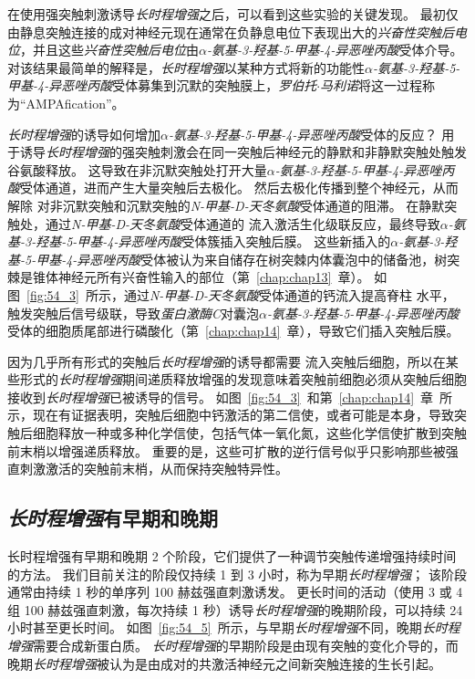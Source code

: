 在使用强突触刺激诱导\textit{长时程增强}之后，可以看到这些实验的关键发现。
最初仅由静息突触连接的成对神经元现在通常在负静息电位下表现出大的\textit{兴奋性突触后电位}，并且这些\textit{兴奋性突触后电位}由\textit{$\alpha$-氨基-3-羟基-5-甲基-4-异恶唑丙酸}受体介导。
对该结果最简单的解释是，\textit{长时程增强}以某种方式将新的功能性\textit{$\alpha$-氨基-3-羟基-5-甲基-4-异恶唑丙酸}受体募集到沉默的突触膜上，\textit{罗伯托$\cdot$马利诺}将这一过程称为“AMPAfication”。


\textit{长时程增强}的诱导如何增加\textit{$\alpha$-氨基-3-羟基-5-甲基-4-异恶唑丙酸}受体的反应？
用于诱导\textit{长时程增强}的强突触刺激会在同一突触后神经元的静默和非静默突触处触发谷氨酸释放。
这导致在非沉默突触处打开大量\textit{$\alpha$-氨基-3-羟基-5-甲基-4-异恶唑丙酸}受体通道，进而产生大量突触后去极化。
然后去极化传播到整个神经元，从而解除  对非沉默突触和沉默突触的\textit{N-甲基-D-天冬氨酸}受体通道的阻滞。
在静默突触处，通过\textit{N-甲基-D-天冬氨酸}受体通道的  流入激活生化级联反应，最终导致\textit{$\alpha$-氨基-3-羟基-5-甲基-4-异恶唑丙酸}受体簇插入突触后膜。
这些新插入的\textit{$\alpha$-氨基-3-羟基-5-甲基-4-异恶唑丙酸}受体被认为来自储存在树突棘内体囊泡中的储备池，树突棘是锥体神经元所有兴奋性输入的部位（第~\ref{chap:chap13}~章）。
如图~\ref{fig:54_3}~所示，通过\textit{N-甲基-D-天冬氨酸}受体通道的钙流入提高脊柱  水平，触发突触后信号级联，导致\textit{蛋白激酶C}对囊泡\textit{$\alpha$-氨基-3-羟基-5-甲基-4-异恶唑丙酸}受体的细胞质尾部进行磷酸化（第~\ref{chap:chap14}~章），导致它们插入突触后膜。


因为几乎所有形式的突触后\textit{长时程增强}的诱导都需要  流入突触后细胞，所以在某些形式的\textit{长时程增强}期间递质释放增强的发现意味着突触前细胞必须从突触后细胞接收到\textit{长时程增强}已被诱导的信号。
如图~\ref{fig:54_3}~和第~\ref{chap:chap14}~章~所示，现在有证据表明，突触后细胞中钙激活的第二信使，或者可能是本身，导致突触后细胞释放一种或多种化学信使，包括气体一氧化氮，这些化学信使扩散到突触前末梢以增强递质释放。
重要的是，这些可扩散的逆行信号似乎只影响那些被强直刺激激活的突触前末梢，从而保持突触特异性。



\subsection{\textit{长时程增强}有早期和晚期}

长时程增强有早期和晚期 2 个阶段，它们提供了一种调节突触传递增强持续时间的方法。
我们目前关注的阶段仅持续 1 到 3 小时，称为早期\textit{长时程增强}；
该阶段通常由持续 1 秒的单序列 100 赫兹强直刺激诱发。
更长时间的活动（使用 3 或 4 组 100 赫兹强直刺激，每次持续 1 秒）诱导\textit{长时程增强}的晚期阶段，可以持续 24 小时甚至更长时间。
如图~\ref{fig:54_5}~所示，与早期\textit{长时程增强}不同，晚期\textit{长时程增强}需要合成新蛋白质。
\textit{长时程增强}的早期阶段是由现有突触的变化介导的，而晚期\textit{长时程增强}被认为是由成对的共激活神经元之间新突触连接的生长引起。


